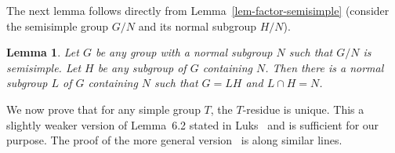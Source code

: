 \documentclass[11pt]{madras}%
\newtheorem{lemma}[theorem]{Lemma}
\theoremstyle{remark}
\begin{document}
The next lemma follows directly from Lemma~\ref{lem-factor-semisimple}
(consider the semisimple group $G/N$ and its normal subgroup $H/N$).

\begin{lemma}\label{lem-factor-semisimple-general}
  Let $G$ be any group with a normal subgroup $N$ such that $G/N$ is
  semisimple. Let $H$ be any subgroup of $G$ containing $N$.  Then
  there is a normal subgroup $L$ of $G$ containing $N$ such that $G =
  LH$ and $L \cap H = N$.
\end{lemma}

We now prove that for any simple group $T$, the $T$-residue is unique.
This a slightly weaker version of Lemma~{6.2} stated in
Luks~\cite{luks86parallel} and is sufficient for our purpose. The
proof of the more general version~\cite[Lemma 6.2]{luks86parallel} is
along similar lines.
\end{document}
